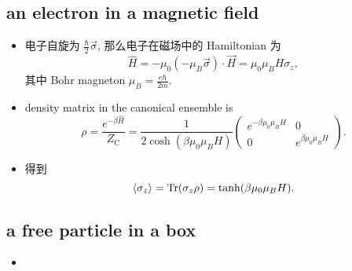 \subsection{an electron in a magnetic field}
\begin{itemize}
	\item 电子自旋为 $\frac{\hbar}{2} \vec{\sigma}$, 那么电子在磁场中的 Hamiltonian 为
	\begin{equation}
		\hat{H} = - \mu_0 (- \mu_B \vec{\sigma}) \cdot \vec{H} = \mu_0 \mu_B H \sigma_z,
	\end{equation}
	其中 Bohr magneton $\mu_B = \frac{e \hbar}{2 m}$.
	
	\item density matrix in the canonical ensemble is
	\begin{equation}
		\rho = \frac{e^{- \beta \hat{H}}}{Z_\text{C}} = \frac{1}{2 \cosh(\beta \mu_0 \mu_B H)} \begin{pmatrix}
			e^{- \beta \mu_0 \mu_B H} & 0 \\
			0 & e^{\beta \mu_0 \mu_B H}
		\end{pmatrix}.
	\end{equation}
	
	\item 得到
	\begin{equation}
		\braket{\sigma_z} = \mathrm{Tr}(\sigma_z \rho) = \tanh(\beta \mu_0 \mu_B H).
	\end{equation}
\end{itemize}

\subsection{a free particle in a box}
\begin{itemize}
	\item 
\end{itemize}
